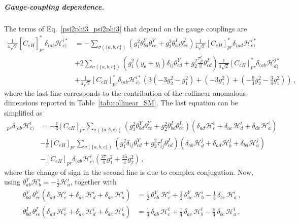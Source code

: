 \subparagraph{Gauge-coupling dependence.}
The terms of Eq.~\eqref{psi2phi3_psi2phi3} that depend on the gauge couplings are
\begin{align}
    \frac{1}{4\sqrt{2}}[\dot C_{eH}]^*_{pr} \delta_{(ab}\mathcal H_{c)}^{i*} &=     
    - \sum_{\sigma(\{a,b,c\})} 
    \left(g_1^2 \theta^Y_{bd}\theta^Y_{ce} + g_2^2 \theta^I_{bd}\theta^I_{ce} \right)
    \frac{1}{4\sqrt{2}}[ C_{eH}]^*_{pr} \delta_{(ad}\mathcal H_{e)}^{i*} \nonumber 
\\
    & + 2\sum_{\sigma(\{a,b,c\})}  
    \left(g_1^2 (y_{\mathsf e} + y_{\mathsf l})\delta_{ij}\theta^Y_{cd} + g_2^2 \frac{\tau^I_{ji}}{2} \theta^I_{cd}\right)
    \frac{1}{4\sqrt{2}}[ C_{eH}]^*_{pr} \delta_{(ab}\mathcal H_{d)}^{j*} \nonumber \\
    & + \frac{1}{4\sqrt{2}}[ C_{eH}]^*_{pr} \delta_{(ab}\mathcal H_{c)}^{i*} \left(3\left(-3g_2^2-g_1^2\right) + \left(- 3 g_1^2\right) + \left(-\frac{9}{4}g_2^2-\frac{3}{4}g_1^2\right) \right) 
    \,,
\end{align}
where the last line corresponds to the contribution of the collinear anomalous dimensions reported in Table~\ref{tab:collinear_SM}.
The last equation can be simplified as
\begin{align}
    [\dot C_{eH}]_{pr} \delta_{(ab}\mathcal H_{c)}^{i} &=-\frac{1}{3} [ C_{eH}]_{pr} \sum_{\sigma(\{a,b,c\})} 
    \left(g_1^2 \theta^Y_{bd}\theta^Y_{ce} + g_2^2 \theta^I_{bd}\theta^I_{ce} \right)
    \left(\delta_{ad}\mathcal H^i_{e} + \delta_{ae}\mathcal H^i_{d} + \delta_{de}\mathcal H^i_{a}\right)
    \nonumber 
\\
    & - \frac{1}{3}[C_{eH}]_{pr} \sum_{\sigma(\{a,b,c\})}  
    \left( g_1^2 \delta_{ij}\theta^Y_{cd} + g_2^2 \tau^I_{ij} \theta^I_{cd}\right)
    \left(\delta_{ab}\mathcal H_{d}^{j} + \delta_{ad}\mathcal H_{b}^{j} + \delta_{bd}\mathcal H_{a}^{j}\right)
    \nonumber \\
    & - [ C_{eH}]_{pr} \delta_{(ab}\mathcal H_{c)}^{i} \left(\frac{27}{4}g_1^2 + \frac{45}{4}g_2^2 \right) \,,\label{eq:CeH<-CeH_gauge_partial}
\end{align}
where the change of sign in the second line is due to complex conjugation.
Now, using $\theta^Y_{ab}\mathcal H_b^i = - \frac{1}{2}\mathcal H^i_a$, together with 
\begin{align}
        \theta^Y_{bd}\,\theta^Y_{ce}\left(\delta_{ad}\,\mathcal{H}^i_e + \delta_{ae}\,\mathcal{H}^i_d + \delta_{de}\,\mathcal{H}^i_a\right)
    &= \frac{1}{2}\,\theta^Y_{ab}\,\mathcal{H}^i_c
    + \frac{1}{2}\,\theta^Y_{ac}\,\mathcal{H}^i_b
    - \frac{1}{4}\,\delta_{bc}\,\mathcal{H}^i_a\,,
    \\
        \theta^I_{bd}\,\theta^I_{ce}\left(\delta_{ad}\,\mathcal{H}^i_e + \delta_{ae}\,\mathcal{H}^i_d + \delta_{de}\,\mathcal{H}^i_a\right)
    &= \frac{1}{4}\,\delta_{ab}\,\mathcal{H}^i_c
    + \frac{1}{4}\,\delta_{ac}\,\mathcal{H}^i_b
    - \frac{5}{4}\,\delta_{bc}\,\mathcal{H}^i_a\,,
\end{align}
